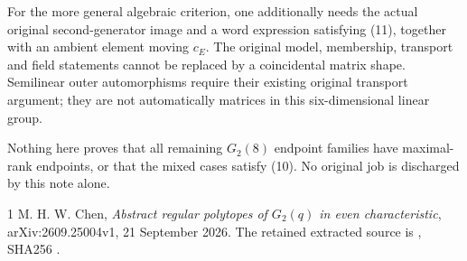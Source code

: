 \documentclass[11pt]{article}
\begin{document}
For the more general algebraic criterion, one additionally needs the
actual original second-generator image and a word expression satisfying
(11), together with an ambient element moving \(c_E\).
The original model, membership, transport and field statements cannot
be replaced by a coincidental matrix shape.
Semilinear outer automorphisms require their existing original
transport argument; they are not automatically matrices in this
six-dimensional linear group.

Nothing here proves that all remaining \(G_2(8)\) endpoint families
have maximal-rank endpoints, or that the mixed cases satisfy (10).
No original job is discharged by this note alone.

\begin{thebibliography}{1}
M. H. W. Chen,
\emph{Abstract regular polytopes of \(G_2(q)\) in even characteristic},
arXiv:2609.25004v1, 21 September 2026.
The retained extracted source is
\texttt{},
SHA256
\texttt{}.
\end{thebibliography}
\end{document}
